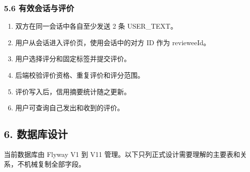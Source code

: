 \documentclass[
]{ctexart}
\providecommand{\tightlist}{%
  \setlength{\itemsep}{0pt}\setlength{\parskip}{0pt}}
\begin{document}
\hypertarget{ux6709ux6548ux4f1aux8bddux4e0eux8bc4ux4ef7}{%
\subsubsection{5.6
有效会话与评价}\label{ux6709ux6548ux4f1aux8bddux4e0eux8bc4ux4ef7}}

\begin{enumerate}
\def\labelenumi{\arabic{enumi}.}
\tightlist
\item
  双方在同一会话中各自至少发送 2 条 USER\_TEXT。
\item
  用户从会话进入评价页，使用会话中的对方 ID 作为 revieweeId。
\item
  用户选择评分和固定标签并提交评价。
\item
  后端校验评价资格、重复评价和评分范围。
\item
  评价写入后，信用摘要统计随之更新。
\item
  用户可查询自己发出和收到的评价。
\end{enumerate}

\hypertarget{ux6570ux636eux5e93ux8bbeux8ba1}{%
\subsection{6. 数据库设计}\label{ux6570ux636eux5e93ux8bbeux8ba1}}

当前数据库由 Flyway V1 到 V11
管理。以下只列正式设计需要理解的主要表和关系，不机械复制全部字段。
\end{document}
